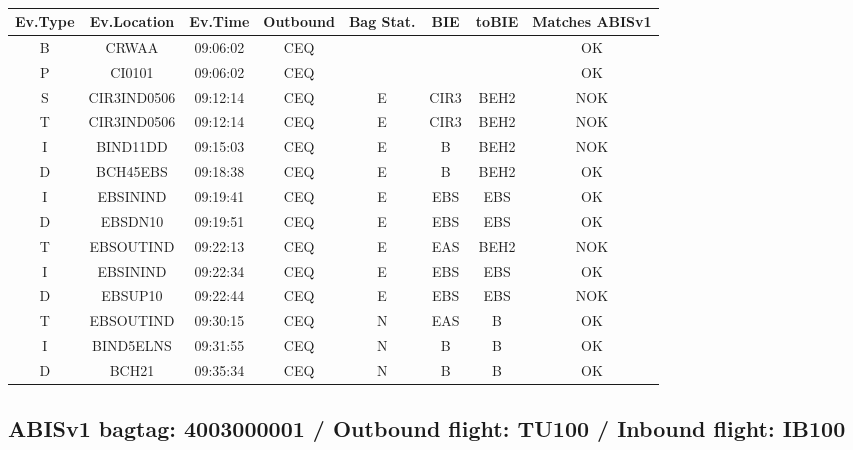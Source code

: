 \documentclass{report}
\begin{document}
\paragraph{}
\begin{longtable}{cccccccc}    \toprule
\rowcolor{white!50}
\textbf{Ev.Type} & \textbf{Ev.Location} & \textbf{Ev.Time} & \textbf{Outbound} & \textbf{Bag Stat.} & \textbf{BIE} & \textbf{toBIE} & \textbf{Matches ABISv1} \\\midrule
B & CRWAA & 09:06:02  & CEQ &  &  &  & OK\\
P & CI0101 & 09:06:02  & CEQ &  &  &  & OK\\
S & CIR3IND0506 & 09:12:14  & CEQ & E & CIR3 & BEH2 & NOK\\
T & CIR3IND0506 & 09:12:14  & CEQ & E & CIR3 & BEH2 & NOK\\
I & BIND11DD & 09:15:03  & CEQ & E & B & BEH2 & NOK\\
D & BCH45EBS & 09:18:38  & CEQ & E & B & BEH2 & OK\\
I & EBSININD & 09:19:41  & CEQ & E & EBS & EBS & OK\\
D & EBSDN10 & 09:19:51  & CEQ & E & EBS & EBS & OK\\
T & EBSOUTIND & 09:22:13  & CEQ & E & EAS & BEH2 & NOK\\
I & EBSININD & 09:22:34  & CEQ & E & EBS & EBS & OK\\
D & EBSUP10 & 09:22:44  & CEQ & E & EBS & EBS & NOK\\
T & EBSOUTIND & 09:30:15  & CEQ & N & EAS & B & OK\\
I & BIND5ELNS & 09:31:55  & CEQ & N & B & B & OK\\
D & BCH21 & 09:35:34  & CEQ & N & B & B & OK\\
\bottomrule
\end{longtable}
\subsection*{ABISv1 bagtag: 4003000001 / Outbound flight: TU100 / Inbound flight: IB100}
\end{document}
